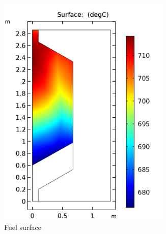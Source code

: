 \documentclass{elsarticle}
\begin{document}
\begin{figure}[h]
\begin{subfigure}[b]{0.3\textwidth}
        \includegraphics[width=0.9\textwidth]{./images/diffusion/tmsr/SS/ms/T_fuel(steady_state).png}
        \caption{Fuel surface}
    \end{subfigure}
    ~
    \begin{subfigure}[b]{0.3\textwidth}
        \centering

\end{subfigure}
\end{figure}
\end{document}
